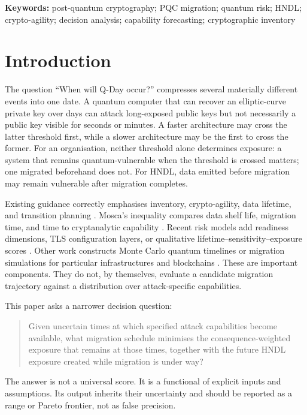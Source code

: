 \documentclass[10pt]{article}
\begin{document}
\textbf{Keywords:} post-quantum cryptography; PQC migration; quantum risk; HNDL; crypto-agility; decision analysis; capability forecasting; cryptographic inventory

\section{Introduction}

The question ``When will Q-Day occur?'' compresses several materially different events into one date. A quantum computer that can recover an elliptic-curve private key over days can attack long-exposed public keys but not necessarily a public key visible for seconds or minutes. A faster architecture may cross the latter threshold first, while a slower architecture may be the first to cross the former. For an organisation, neither threshold alone determines exposure: a system that remains quantum-vulnerable when the threshold is crossed matters; one migrated beforehand does not. For HNDL, data emitted before migration may remain vulnerable after migration completes.

Existing guidance correctly emphasises inventory, crypto-agility, data lifetime, and transition planning \cite{nistpqc,nist8547,nccoe,etsi,hasan2024}. Mosca's inequality compares data shelf life, migration time, and time to cryptanalytic capability \cite{mosca2018}. Recent risk models add readiness dimensions, TLS configuration layers, or qualitative lifetime--sensitivity--exposure scores \cite{cars2026,tlsrisk2026,conceptualise2026}. Other work constructs Monte Carlo quantum timelines or migration simulations for particular infrastructures and blockchains \cite{gri2025,sammo2026,horizon2026}. These are important components. They do not, by themselves, evaluate a candidate migration trajectory against a distribution over attack-specific capabilities.

This paper asks a narrower decision question:

\begin{quote}
Given uncertain times at which specified attack capabilities become available, what migration schedule minimises the consequence-weighted exposure that remains at those times, together with the future HNDL exposure created while migration is under way?
\end{quote}

The answer is not a universal score. It is a functional of explicit inputs and assumptions. Its output inherits their uncertainty and should be reported as a range or Pareto frontier, not as false precision.
\end{document}

